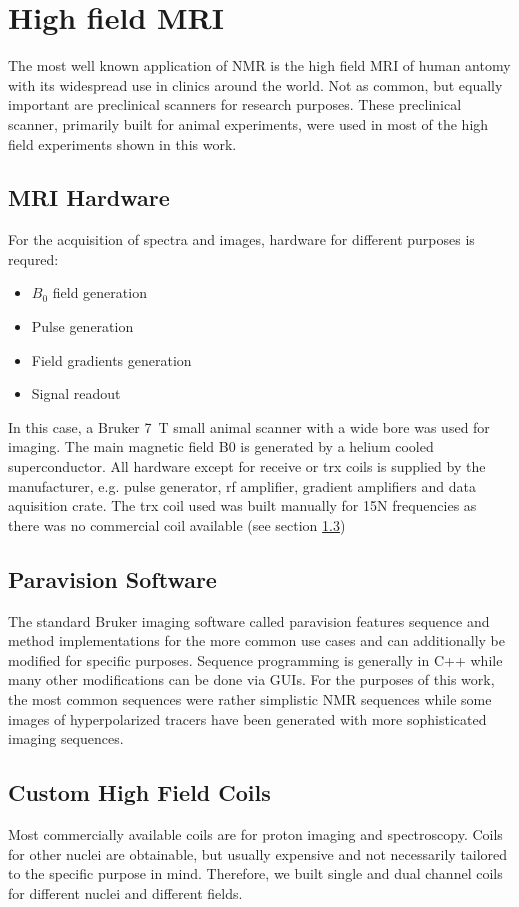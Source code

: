     \section{High field MRI}
        The most well known application of NMR is the high field MRI of human antomy with its widespread use in clinics around the world. Not as common, but equally important are preclinical scanners for research purposes. These preclinical scanner, primarily built for animal experiments, were used in most of the high field experiments shown in this work.  \subsection{MRI Hardware}
            For the acquisition of spectra and images, hardware for different purposes is requred:
            \begin{itemize}
            \item $B_0$ field generation
            \item Pulse generation
            \item Field gradients generation
            \item Signal readout
            \end{itemize}
            In this case, a Bruker \SI{7}{\tesla} small animal scanner with a wide bore was used for imaging. The main magnetic field B0 is generated by a helium cooled superconductor. All hardware except for receive or trx coils is supplied by the manufacturer, e.g. pulse generator, rf amplifier, gradient amplifiers and data aquisition crate. The trx coil used was built manually for 15N frequencies as there was no commercial coil available (see section \ref{})
        \subsection{Paravision Software}
            The standard Bruker imaging software called paravision features sequence and method implementations for the more common use cases and can additionally be modified for specific purposes. Sequence programming is generally in C++ while many other modifications can be done via GUIs.  For the purposes of this work, the most common sequences were rather simplistic NMR sequences while some images of hyperpolarized tracers have been generated with more sophisticated imaging sequences.
        \subsection{Custom High Field Coils}
            Most commercially available coils are for proton imaging and spectroscopy. Coils for other nuclei are obtainable, but usually expensive and not necessarily tailored to the specific purpose in mind. Therefore, we built single and dual channel coils for different nuclei and different fields.
